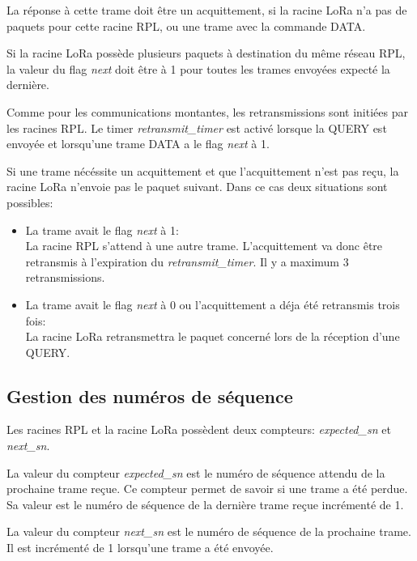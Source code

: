     La réponse à cette trame doit être un acquittement, si la racine LoRa n'a pas de paquets pour cette racine RPL, ou une trame avec la commande DATA.

    Si la racine LoRa possède plusieurs paquets à destination du même réseau RPL, la valeur du flag \textit{next} doit être à 1 pour toutes les trames envoyées expecté la dernière.

    Comme pour les communications montantes, les retransmissions sont initiées par les racines RPL.
    Le timer \textit{retransmit\_timer} est activé lorsque la QUERY est envoyée et lorsqu'une trame DATA a le flag \textit{next} à 1.

    Si une trame nécéssite un acquittement et que l'acquittement n'est pas reçu, la racine LoRa n'envoie pas le paquet suivant. Dans ce cas deux situations sont possibles:
    \begin{itemize}
        \item La trame avait le flag \textit{next} à 1:\\
            La racine RPL s'attend à une autre trame. L'acquittement va donc être retransmis à l'expiration du \textit{retransmit\_timer}. Il y a maximum 3 retransmissions.
        \item La trame avait le flag \textit{next} à 0 ou l'acquittement a déja été retransmis trois fois:\\
            La racine LoRa retransmettra le paquet concerné lors de la réception d'une QUERY.
    \end{itemize}

\subsection{Gestion des numéros de séquence}
    Les racines RPL et la racine LoRa possèdent deux compteurs: \textit{expected\_sn} et \textit{next\_sn}.

    La valeur du compteur \textit{expected\_sn} est le numéro de séquence attendu de la prochaine trame reçue. Ce compteur permet de savoir si une trame a été perdue. Sa valeur est le numéro de séquence de la dernière trame reçue incrémenté de 1.

    La valeur du compteur \textit{next\_sn} est le numéro de séquence de la prochaine trame. Il est incrémenté de 1 lorsqu'une trame a été envoyée.

